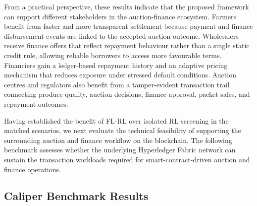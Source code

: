 \documentclass[12pt]{article}
\begin{document}
From a practical perspective, these results indicate that the proposed framework can support different stakeholders in the auction-finance ecosystem. Farmers benefit from faster and more transparent settlement because payment and finance disbursement events are linked to the accepted auction outcome. Wholesalers receive finance offers that reflect repayment behaviour rather than a single static credit rule, allowing reliable borrowers to access more favourable terms. Financiers gain a ledger-based repayment history and an adaptive pricing mechanism that reduces exposure under stressed default conditions. Auction centres and regulators also benefit from a tamper-evident transaction trail connecting produce quality, auction decisions, finance approval, packet sales, and repayment outcomes.

Having established the benefit of FL-RL over isolated RL screening in the matched scenarios, we next evaluate the technical feasibility of supporting the surrounding auction and finance workflow on the blockchain. The following benchmark assesses whether the underlying Hyperledger Fabric network can sustain the transaction workloads required for smart-contract-driven auction and finance operations.

\subsection{Caliper Benchmark Results}
\end{document}

